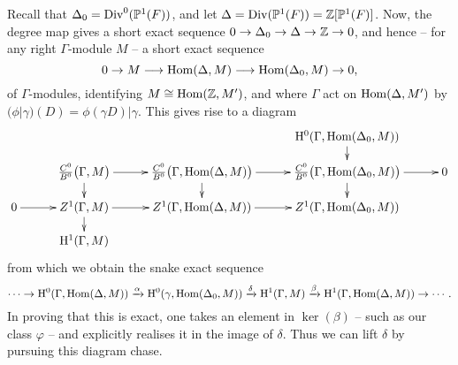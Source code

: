\documentclass[a4paper,10pt]{article}
\numberwithin{equation}{section}
\begin{document}
Recall that $\Delta_0 = \mathrm{Div}^0(\mathbb{P}^1(F))$, and let $\Delta = \mathrm{Div}(\mathbb{P}^1(F)) = \mathbb{Z}[\mathbb{P}^1(F)]$. Now, the degree map gives a short exact sequence $0 \to \Delta_0 \to \Delta \to \mathbb{Z} \to 0$, and hence -- for any right $\Gamma$-module $M$ -- a short exact sequence
\[
	0 \to M \longrightarrow \mathrm{Hom}(\Delta,M) \longrightarrow \mathrm{Hom}(\Delta_0,M) \to 0,
\]
of $\Gamma$-modules, identifying $M \cong \mathrm{Hom}(\mathbb{Z},M')$, and where $\Gamma$ act on $\mathrm{Hom}(\Delta,M')$ by $(\phi|\gamma)(D) = \phi(\gamma D)|\gamma$. This gives rise to a diagram
\[
	\xymatrix@C=10mm@R=4mm{
		& & & \h^0(\Gamma,\Hom(\Delta_0,M))\ar[d] &\\
			 & \frac{C^0}{B^0}\big(\Gamma,M\big)\ar[r]\ar[d]   & \frac{C^0}{B^0}\big(\Gamma,\Hom(\Delta,M)\big)\ar[r]\ar[d] &  \frac{C^0}{B^0}\big(\Gamma,\Hom(\Delta_0,M)\big)\ar[r]\ar[d] &0\\
	0 \ar[r]  & Z^1(\Gamma,M)  \ar[r]\ar[d] & Z^1(\Gamma,\Hom(\Delta,M))  \ar[r] & Z^1(\Gamma,\Hom(\Delta_0,M)) &\\
	& \h^1(\Gamma,M) & & & \\
}
\]
from which we obtain the snake exact sequence
\[
\cdots \to \mathrm{H}^0(\Gamma,\mathrm{Hom}(\Delta,M)) \xrightarrow{\alpha} \mathrm{H}^0(\gamma,\mathrm{Hom}(\Delta_0,M)) \xrightarrow{\delta} \mathrm{H}^1(\Gamma,M) \xrightarrow{\beta} \mathrm{H}^1(\Gamma,\mathrm{Hom}(\Delta,M)) \to \cdots.
\]
In proving that this is exact, one takes an element in $\ker(\beta)$ -- such as our class $\varphi$ -- and explicitly realises it in the image of $\delta$. Thus we can lift $\delta$ by pursuing this diagram chase.

\end{document}
